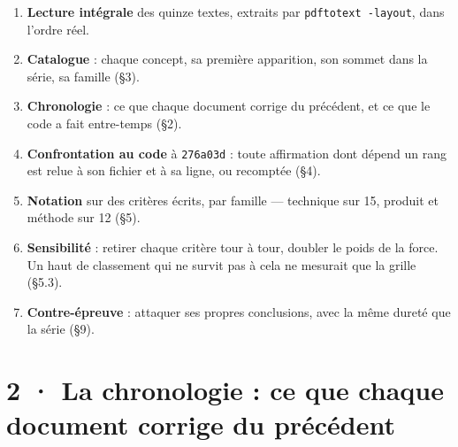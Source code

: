 \documentclass[10pt]{article}
\newcommand{\code}[1]{\texttt{\small #1}}
\begin{document}
\begin{enumerate}[leftmargin=1.4em,itemsep=1pt,topsep=2pt]
\item \textbf{Lecture intégrale} des quinze textes, extraits par \code{pdftotext -layout}, dans l'ordre réel.
\item \textbf{Catalogue} : chaque concept, sa première apparition, son sommet dans la série, sa famille (§3).
\item \textbf{Chronologie} : ce que chaque document corrige du précédent, et ce que le code a fait entre-temps (§2).
\item \textbf{Confrontation au code} à \code{276a03d} : toute affirmation dont dépend un rang est relue à son
fichier et à sa ligne, ou recomptée (§4).
\item \textbf{Notation} sur des critères écrits, par famille --- technique sur 15, produit et méthode sur 12 (§5).
\item \textbf{Sensibilité} : retirer chaque critère tour à tour, doubler le poids de la force. Un haut de
classement qui ne survit pas à cela ne mesurait que la grille (§5.3).
\item \textbf{Contre-épreuve} : attaquer ses propres conclusions, avec la même dureté que la série (§9).
\end{enumerate}

\section{2 · La chronologie : ce que chaque document corrige du précédent}
\end{document}
